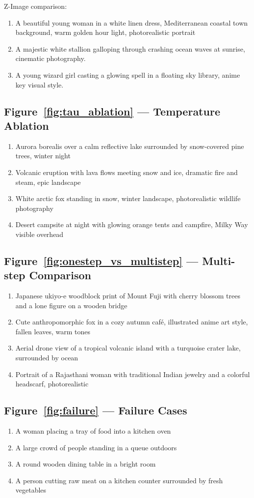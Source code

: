 Z-Image comparison:
\begin{enumerate}
  \item A beautiful young woman in a white linen dress, Mediterranean coastal town background, warm golden hour light, photorealistic portrait
  \item A majestic white stallion galloping through crashing ocean waves at sunrise, cinematic photography.
  \item A young wizard girl casting a glowing spell in a floating sky library, anime key visual style.
\end{enumerate}

\subsection*{Figure~\ref{fig:tau_ablation} --- Temperature Ablation}
\begin{enumerate}
  \item Aurora borealis over a calm reflective lake surrounded by snow-covered pine trees, winter night
  \item Volcanic eruption with lava flows meeting snow and ice, dramatic fire and steam, epic landscape
  \item White arctic fox standing in snow, winter landscape, photorealistic wildlife photography
  \item Desert campsite at night with glowing orange tents and campfire, Milky Way visible overhead
\end{enumerate}

\subsection*{Figure~\ref{fig:onestep_vs_multistep} --- Multi-step Comparison}
\begin{enumerate}
  \item Japanese ukiyo-e woodblock print of Mount Fuji with cherry blossom trees and a lone figure on a wooden bridge
  \item Cute anthropomorphic fox in a cozy autumn caf\'{e}, illustrated anime art style, fallen leaves, warm tones
  \item Aerial drone view of a tropical volcanic island with a turquoise crater lake, surrounded by ocean
  \item Portrait of a Rajasthani woman with traditional Indian jewelry and a colorful headscarf, photorealistic
\end{enumerate}

\subsection*{Figure~\ref{fig:failure} --- Failure Cases}
\begin{enumerate}
  \item A woman placing a tray of food into a kitchen oven
  \item A large crowd of people standing in a queue outdoors
  \item A round wooden dining table in a bright room
  \item A person cutting raw meat on a kitchen counter surrounded by fresh vegetables
\end{enumerate}
